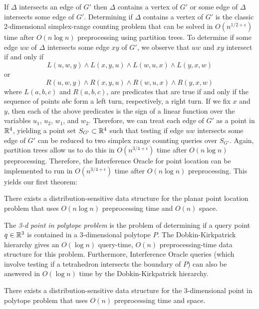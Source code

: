 \documentclass{patmorin}
\begin{document}
If $\Delta$ intersects an edge of $G'$ then $\Delta$ contains a vertex of
$G'$ or some edge of $\Delta$ intersects some edge of $G'$.  Determining if
$\Delta$ contains a vertex of $G'$ is the classic 2-dimensional
simplex-range counting problem that can be solved in $O(n^{1/2+\epsilon})$
time after $O(n\log n)$ preprocessing using partition trees.  To determine
if some edge $uw$ of $\Delta$ intersects some edge $xy$ of $G'$, we observe
that $uw$ and $xy$ intersect if and only if
\[ L(u,w,y) \wedge L(x,y,u) \wedge L(w,u,x) \wedge L(y,x,w) \]
or
\[ R(u,w,y) \wedge R(x,y,u) \wedge R(w,u,x) \wedge R(y,x,w) \]
where $L(a,b,c)$ and $R(a,b,c)$, are predicates that are true if and
only if the sequence of points $abc$ form a left turn, respectively, a
right turn.  If we fix $x$ and $y$, then each of the above predicates is
the sign of a linear function over the variables $u_1$, $u_2$, $w_1$,
and $w_2$.  Therefore, we can treat each edge of $G'$ as a point in
$\mathbb{R}^4$, yielding a point set $S_{G'} \subset\mathbb{R}^4$ such that testing if
edge $uw$ intersects some edge of $G'$ can be reduced to two simplex
range counting queries over $S_{G'}$.  Again, partition trees allow us to
do this in $O(n^{3/4+\epsilon})$ time after $O(n\log n)$ preprocessing.
Therefore, the Interference Oracle for point location can be implemented
to run in $O(n^{3/4+\epsilon})$ time after $O(n\log n)$ preprocessing.
This yields our first theorem:

\begin{thm}
  There exists a distribution-sensitive data structure for the planar
  point location problem that uses $O(n\log n)$ preprocessing time and
  $O(n)$ space.
\end{thm}

The \emph{3-d point in polytope problem} is the problem of determining if
a query point $q\in\mathbb{R}^3$ is contained in a 3-dimensional polytope $P$.
The Dobkin-Kirkpatrick hierarchy \cite{dk83} gives an $O(\log n)$
query-time, $O(n)$ preprocessing-time data structure for this problem.
Furthermore, Interference Oracle queries (which involve testing if a
tetrahedron intersects the boundary of $P$) can also be answered in $O(\log
n)$ time by the Dobkin-Kirkpatrick hierarchy.

\begin{thm}
  There exists a distribution-sensitive data structure for the
  3-dimensional point in polytope problem that uses $O(n)$ preprocessing
  time and space.
\end{thm}
\end{document}
